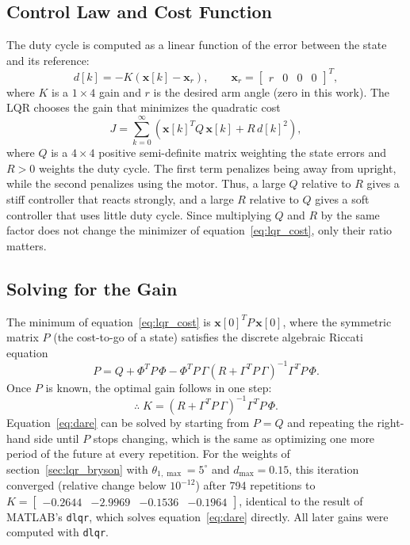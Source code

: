 \documentclass[a4paper,11pt]{article}
\begin{document}
\subsection{Control Law and Cost Function}
The duty cycle is computed as a linear function of the error between the state and its reference:
\begin{equation}
  d[k] = -K\left(\mathbf{x}[k] - \mathbf{x}_r\right), \qquad \mathbf{x}_r = \begin{bmatrix} r & 0 & 0 & 0 \end{bmatrix}^T ,
  \label{eq:lqr_law}
\end{equation}
where $K$ is a $1\times4$ gain and $r$ is the desired arm angle (zero in this work). The LQR chooses the gain that minimizes the quadratic cost
\begin{equation}
  J = \sum_{k=0}^{\infty} \left( \mathbf{x}[k]^T Q\, \mathbf{x}[k] + R\, d[k]^2 \right),
  \label{eq:lqr_cost}
\end{equation}
where $Q$ is a $4\times4$ positive semi-definite matrix weighting the state errors and $R > 0$ weights the duty cycle. The first term penalizes being away from upright, while the second penalizes using the motor. Thus, a large $Q$ relative to $R$ gives a stiff controller that reacts strongly, and a large $R$ relative to $Q$ gives a soft controller that uses little duty cycle. Since multiplying $Q$ and $R$ by the same factor does not change the minimizer of equation~\ref{eq:lqr_cost}, only their ratio matters.

\subsection{Solving for the Gain}
The minimum of equation~\ref{eq:lqr_cost} is $\mathbf{x}[0]^T P\, \mathbf{x}[0]$, where the symmetric matrix $P$ (the cost-to-go of a state) satisfies the discrete algebraic Riccati equation
\begin{equation}
  P = Q + \Phi^T P\, \Phi - \Phi^T P\, \Gamma \left(R + \Gamma^T P\, \Gamma\right)^{-1} \Gamma^T P\, \Phi .
  \label{eq:dare}
\end{equation}
Once $P$ is known, the optimal gain follows in one step:
\begin{equation}
  \therefore\; K = \left(R + \Gamma^T P\, \Gamma\right)^{-1} \Gamma^T P\, \Phi .
  \label{eq:lqr_K}
\end{equation}
Equation~\ref{eq:dare} can be solved by starting from $P = Q$ and repeating the right-hand side until $P$ stops changing, which is the same as optimizing one more period of the future at every repetition. For the weights of section~\ref{sec:lqr_bryson} with $\theta_{1,\max} = 5^\circ$ and $d_{\max} = 0.15$, this iteration converged (relative change below $10^{-12}$) after 794 repetitions to $K = \begin{bmatrix} -0.2644 & -2.9969 & -0.1536 & -0.1964 \end{bmatrix}$, identical to the result of MATLAB's \texttt{dlqr}, which solves equation~\ref{eq:dare} directly. All later gains were computed with \texttt{dlqr}.
\end{document}

